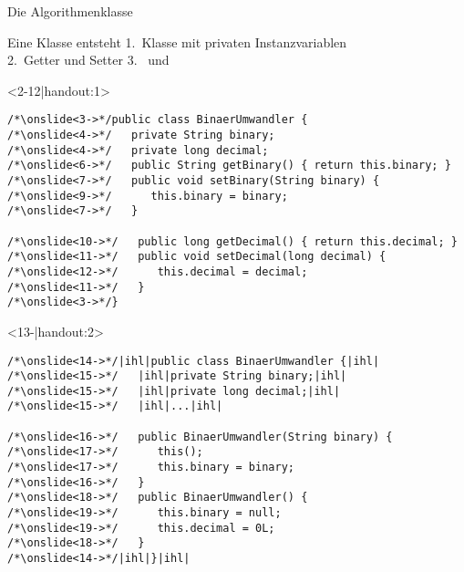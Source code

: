 {
\begin{frame}[c]{Die Algorithmenklasse}
%
\end{frame}
\SidebarReset
\SidebarSolution
\begin{frame}[fragile,c]{Eine Klasse entsteht}
 {1.~Klasse  mit privaten Instanzvariablen\smallskip\\
 {2.~Getter und Setter}}
 {3.~ und }
\medskip
\SetupLstHl
\begin{onlyenv}<2-12|handout:1>
\begin{verbatim}
/*\onslide<3->*/public class BinaerUmwandler {
/*\onslide<4->*/   private String binary;
/*\onslide<4->*/   private long decimal;
/*\onslide<6->*/   public String getBinary() { return this.binary; }
/*\onslide<7->*/   public void setBinary(String binary) {
/*\onslide<9->*/      this.binary = binary;
/*\onslide<7->*/   }

/*\onslide<10->*/   public long getDecimal() { return this.decimal; }
/*\onslide<11->*/   public void setDecimal(long decimal) {
/*\onslide<12->*/      this.decimal = decimal;
/*\onslide<11->*/   }
/*\onslide<3->*/}
\end{verbatim}
\end{onlyenv}
\begin{onlyenv}<13-|handout:2>
\begin{verbatim}
/*\onslide<14->*/|ihl|public class BinaerUmwandler {|ihl|
/*\onslide<15->*/   |ihl|private String binary;|ihl|
/*\onslide<15->*/   |ihl|private long decimal;|ihl|
/*\onslide<15->*/   |ihl|...|ihl|

/*\onslide<16->*/   public BinaerUmwandler(String binary) {
/*\onslide<17->*/      this();
/*\onslide<17->*/      this.binary = binary;
/*\onslide<16->*/   }
/*\onslide<18->*/   public BinaerUmwandler() {
/*\onslide<19->*/      this.binary = null;
/*\onslide<19->*/      this.decimal = 0L;
/*\onslide<18->*/   }
/*\onslide<14->*/|ihl|}|ihl|
\end{verbatim}
\end{onlyenv}
\end{frame}
\SidebarReset

}
